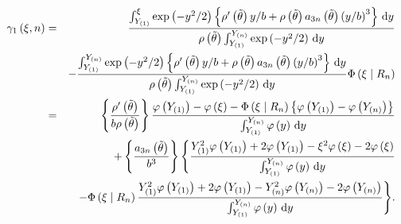 \begin{eqnarray*}
\gamma_{1}\left(\xi,n\right) & = & \frac{\int_{Y_{\left(1\right)}}^{\xi}\exp\left(-y^{2}/2\right)\left\{ \rho'\left(\tilde{\theta}\right)y/b+\rho\left(\tilde{\theta}\right)a_{3n}\left(\tilde{\theta}\right)\left(y/b\right)^{3}\right\} \,\mathrm{d} y}{\rho\left(\tilde{\theta}\right)\int_{Y_{\left(1\right)}}^{Y_{\left(n\right)}}\exp\left(-y^{2}/2\right)\,\mathrm{d} y}\\
 &  & -\frac{\int_{Y_{\left(1\right)}}^{Y_{\left(n\right)}}\exp\left(-y^{2}/2\right)\left\{ \rho'\left(\tilde{\theta}\right)y/b+\rho\left(\tilde{\theta}\right)a_{3n}\left(\tilde{\theta}\right)\left(y/b\right)^{3}\right\} \,\mathrm{d} y}{\rho\left(\tilde{\theta}\right)\int_{Y_{\left(1\right)}}^{Y_{\left(n\right)}}\exp\left(-y^{2}/2\right)\,\mathrm{d} y}\Phi\left(\xi\mid R_{n}\right)\\
 & = & \left\{ \frac{\rho'\left(\tilde{\theta}\right)}{b\rho\left(\tilde{\theta}\right)}\right\} \frac{\varphi\left(Y_{\left(1\right)}\right)-\varphi\left(\xi\right)-\Phi\left(\xi\mid R_{n}\right)\left\{ \varphi\left(Y_{\left(1\right)}\right)-\varphi\left(Y_{\left(n\right)}\right)\right\} }{\int_{Y_{\left(1\right)}}^{Y_{\left(n\right)}}\varphi\left(y\right)\,\mathrm{d} y}\\
 &  & +\left\{ \frac{a_{3n}\left(\tilde{\theta}\right)}{b^{3}}\right\} \Bigg\{\frac{Y_{\left(1\right)}^{2}\varphi\left(Y_{\left(1\right)}\right)+2\varphi\left(Y_{\left(1\right)}\right)-\xi^{2}\varphi\left(\xi\right)-2\varphi\left(\xi\right)}{\int_{Y_{\left(1\right)}}^{Y_{\left(n\right)}}\varphi\left(y\right)\,\mathrm{d} y}\\
 &  & -\Phi\left(\xi\mid R_{n}\right)\frac{Y_{\left(1\right)}^{2}\varphi\left(Y_{\left(1\right)}\right)+2\varphi\left(Y_{\left(1\right)}\right)-Y_{\left(n\right)}^{2}\varphi\left(Y_{\left(n\right)}\right)-2\varphi\left(Y_{\left(n\right)}\right)}{\int_{Y_{\left(1\right)}}^{Y_{\left(n\right)}}\varphi\left(y\right)\,\mathrm{d} y}\Bigg\}.
\end{eqnarray*}
 

